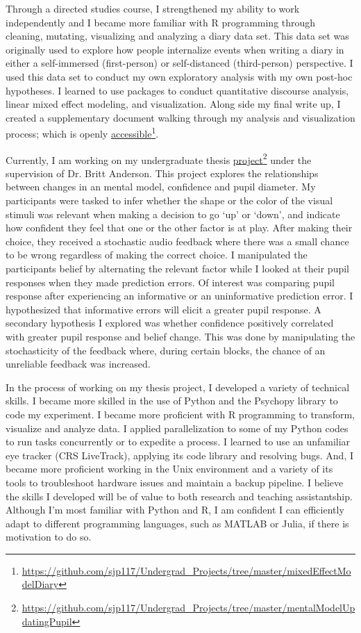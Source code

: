 \documentclass[12pt]{article}
\begin{document}
	Through a directed studies course, I strengthened my ability to work independently and I became more familiar with R programming through cleaning, mutating, visualizing and analyzing a diary data set. This data set was originally used to explore how people internalize events when writing a diary in either a self-immersed (first-person) or self-distanced (third-person) perspective. I used this data set to conduct my own exploratory analysis with my own post-hoc hypotheses. I learned to use packages to conduct quantitative discourse analysis, linear mixed effect modeling, and visualization. Along side my final write up, I created a supplementary document walking through my analysis and visualization process; which is openly  \href{https://github.com/sjp117/Undergrad_Projects/tree/master/mixedEffectModelDiary}{accessible}\footnote{\url{https://github.com/sjp117/Undergrad\_Projects/tree/master/mixedEffectModelDiary}}.
	
	Currently, I am working on my undergraduate thesis \href{https://github.com/sjp117/Undergrad_Projects/tree/master/mentalModelUpdatingPupil}{project}\footnote{\url{https://github.com/sjp117/Undergrad\_Projects/tree/master/mentalModelUpdatingPupil}} under the supervision of Dr. Britt Anderson. This project explores the relationships between changes in an mental model, confidence and pupil diameter. My participants were tasked to infer whether the shape or the color of the visual stimuli was relevant when making a decision to go `up' or `down', and indicate how confident they feel that one or the other factor is at play. After making their choice, they received a stochastic audio feedback where there was a small chance to be wrong regardless of making the correct choice. I manipulated the participants belief by alternating the relevant factor while I looked at their pupil responses when they made prediction errors. Of interest was comparing pupil response after experiencing an informative or an uninformative prediction error. I hypothesized that informative errors will elicit a greater pupil response. A secondary hypothesis I explored was whether confidence positively correlated with greater pupil response and belief change. This was done by manipulating the stochasticity of the feedback where, during certain blocks, the chance of an unreliable feedback was increased.
	
	In the process of working on my thesis project, I developed a variety of technical skills. I became more skilled in the use of Python and the Psychopy library to code my experiment. I became more proficient with R programming to transform, visualize and analyze data. I applied parallelization to some of my Python codes to run tasks concurrently or to expedite a process. I learned to use an unfamiliar eye tracker (CRS LiveTrack), applying its code library and resolving bugs. And, I became more proficient working in the Unix environment and a variety of its tools to troubleshoot hardware issues and maintain a backup pipeline. I believe the skills I developed will be of value to both research and teaching assistantship. Although I’m most familiar with Python and R, I am confident I can efficiently adapt to different programming languages, such as MATLAB or Julia, if there is motivation to do so.
	
\end{document}
